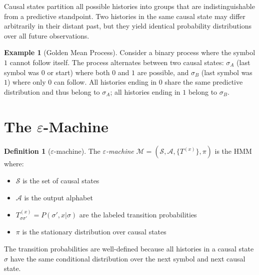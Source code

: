 \documentclass[11pt,twocolumn]{article}
\theoremstyle{plain}
\theoremstyle{definition}
\newtheorem{definition}[theorem]{Definition}
\newtheorem{exampleenv}[theorem]{Example}
\theoremstyle{remark}
\newcommand{\eps}{\varepsilon}
\newcommand{\eM}{$\eps$-machine}
\newcommand{\calS}{\mathcal{S}}
\newcommand{\calA}{\mathcal{A}}
\newcommand{\calM}{\mathcal{M}}
\begin{document}
Causal states partition all possible histories into groups that are indistinguishable from a predictive standpoint. Two histories in the same causal state may differ arbitrarily in their distant past, but they yield identical probability distributions over all future observations.

\begin{exampleenv}[Golden Mean Process]
Consider a binary process where the symbol $1$ cannot follow itself. The process alternates between two causal states: $\sigma_A$ (last symbol was $0$ or start) where both $0$ and $1$ are possible, and $\sigma_B$ (last symbol was $1$) where only $0$ can follow. All histories ending in $0$ share the same predictive distribution and thus belong to $\sigma_A$; all histories ending in $1$ belong to $\sigma_B$.
\end{exampleenv}

\section{The \texorpdfstring{$\eps$}{ε}-Machine}
\label{sec:epsilon-machine}

\begin{definition}[\eM]
The \emph{\eM} $\calM = (\calS, \calA, \{T^{(x)}\}, \pi)$ is the HMM where:
\begin{itemize}[nosep]
    \item $\calS$ is the set of causal states
    \item $\calA$ is the output alphabet
    \item $T^{(x)}_{\sigma\sigma'} = P(\sigma', x | \sigma)$ are the labeled transition probabilities
    \item $\pi$ is the stationary distribution over causal states
\end{itemize}
\end{definition}

The transition probabilities are well-defined because all histories in a causal state $\sigma$ have the same conditional distribution over the next symbol and next causal state.
\end{document}
